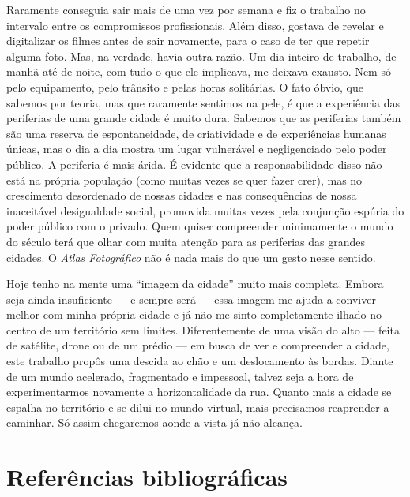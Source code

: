 Raramente conseguia sair mais de uma vez por semana e fiz o trabalho no
intervalo entre os compromissos profissionais. Além disso, gostava de
revelar e digitalizar os filmes antes de sair novamente, para o caso de
ter que repetir alguma foto. Mas, na verdade, havia outra razão. Um dia
inteiro de trabalho, de manhã até de noite, com tudo o que ele
implicava, me deixava exausto. Nem só pelo equipamento, pelo trânsito e
pelas horas solitárias. O fato óbvio, que sabemos por teoria, mas que raramente
sentimos na pele, é que a experiência das periferias de uma grande
cidade é muito dura. Sabemos que as periferias também são uma reserva de
espontaneidade, de criatividade e de experiências humanas únicas, mas o
dia a dia mostra um lugar vulnerável e negligenciado pelo poder público.
A periferia é mais árida. É evidente que a responsabilidade disso não
está na própria população (como muitas vezes se quer fazer crer), mas no
crescimento desordenado de nossas cidades e nas consequências de nossa
inaceitável desigualdade social, promovida muitas vezes pela conjunção
espúria do poder público com o privado. Quem quiser compreender
minimamente o mundo do século  terá que olhar com muita atenção para
as periferias das grandes cidades. O \emph{Atlas Fotográfico} não é nada
mais do que um gesto nesse sentido.

Hoje tenho na mente uma ``imagem da cidade'' muito mais completa. Embora
seja ainda insuficiente --- e sempre será --- essa imagem me ajuda a
conviver melhor com minha própria cidade e já não me sinto completamente
ilhado no centro de um território sem limites. Diferentemente de uma visão do alto --- feita de satélite, drone ou de um prédio --- em busca de ver e compreender a cidade, este trabalho propôs uma descida ao chão e um deslocamento às bordas. Diante de um mundo acelerado, fragmentado e impessoal, talvez seja a hora de experimentarmos novamente a horizontalidade da rua. Quanto mais a cidade se espalha no território e se dilui no mundo virtual, mais precisamos reaprender a caminhar. Só assim chegaremos aonde a vista já não alcança.

\chapter*{Referências bibliográficas}


